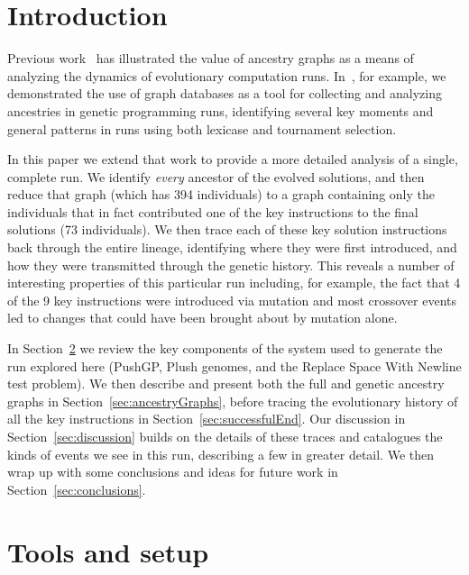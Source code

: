 \documentclass[graybox]{svmult}
\begin{document}

\section{Introduction}
\label{sec:introduction}

Previous work~\cite{McPhee:2015:GPTP, donatuccianalysis, Burlacu:2013:GECCOcomp:new,burlacu2015effectiveness,Burlacu:CIEES:2015,burlacu2015building, kuber2014ancestral} has
illustrated the value of ancestry graphs as a means of analyzing the dynamics
of evolutionary computation runs. In~\cite{McPhee:2015:GPTP}, for example, we
demonstrated the use of graph databases as a tool for collecting and analyzing
ancestries in genetic programming runs, identifying several key moments and
general patterns in runs using both lexicase and tournament selection.

In this paper we extend that work to provide a more detailed analysis of a
single, complete run. We identify \emph{every} ancestor of the evolved 
solutions, and
then reduce that graph (which has 394 individuals) to a graph containing only 
the individuals that in fact contributed one of the key instructions to 
the final solutions (73 individuals). We then trace each of these key solution
instructions back through the entire lineage, identifying where they were first
introduced, and how they were transmitted through the genetic history. This
reveals a number of interesting properties of this particular run including,
for example, the fact that 4 of the 9 key instructions were introduced via 
mutation and most crossover events led to changes that could have been brought about by mutation alone.

In Section~\ref{sec:background} we review the key components of the system
used to generate the run explored here (PushGP, Plush genomes, and the Replace Space With Newline test problem). We then describe and present both the full
and genetic ancestry graphs in Section~\ref{sec:ancestryGraphs}, before
tracing the evolutionary history of all the key instructions in 
Section~\ref{sec:successfulEnd}. Our discussion in 
Section~\ref{sec:discussion} builds on the details of these traces and
catalogues the kinds of events we see in this run, describing a few in greater
detail. We then wrap up with some conclusions and ideas for future work in
Section~\ref{sec:conclusions}.

\section{Tools and setup}
\label{sec:background}
\end{document}
